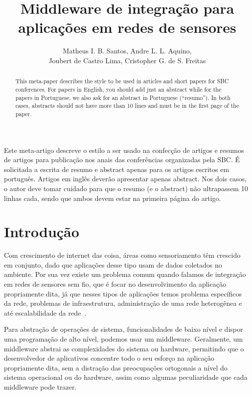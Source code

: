 \documentclass[12pt]{article}
\title{Middleware de integração para aplicações em redes de sensores}
\author{Matheus I. B. Santos\inst{1}, Andre L. L. Aquino\inst{2}, \\ Joubert de Castro Lima\inst{2}, Cristopher G. de S. Freitas\inst{2}}
\begin{document}
 

\maketitle

\begin{abstract}
	This meta-paper describes the style to be used in articles and short papers
	for SBC conferences. For papers in English, you should add just an abstract
	while for the papers in Portuguese, we also ask for an abstract in
	Portuguese (``resumo''). In both cases, abstracts should not have more than
	10 lines and must be in the first page of the paper.
\end{abstract}
     
\begin{resumo} 
	Este meta-artigo descreve o estilo a ser usado na confecção de artigos e
	resumos de artigos para publicação nos anais das conferências organizadas
	pela SBC. É solicitada a escrita de resumo e abstract apenas para os artigos
	escritos em português. Artigos em inglês deverão apresentar apenas abstract.
	Nos dois casos, o autor deve tomar cuidado para que o resumo (e o abstract)
	não ultrapassem 10 linhas cada, sendo que ambos devem estar na primeira
	página do artigo.
\end{resumo}


\section{Introdução}\label{sec:intro}

Com crescimento de internet das coisa, áreas como sensoriamento têm crescido em conjunto, dado que aplicações desse tipo usam de dados coletados no ambiente. Por sua vez existe um problema comum quando falamos de integração em redes de sensores sem fio, que é focar no desenvolvimento da aplicação propriamente dita, já que nesses tipos de aplicações temos problema específicos da rede, problemas de infraestrutura, administração de uma rede heterogênea e até escalabilidade da rede~\cite{Heinzelman2004}.

Para abstração de operações de sistema, funcionalidades de baixo nível e dispor uma programação de alto nível, podemos usar um middleware. Geralmente, um middleware abstrai as complexidades do sistema ou hardware, permitindo que o desenvolvedor de aplicativos concentre todo o seu esforço na aplicação propriamente dita, sem a distração das preocupações ortogonais a nível do sistema operacional ou do hardware, assim como algumas peculiaridade que cada middleware pode trazer.
\end{document}
